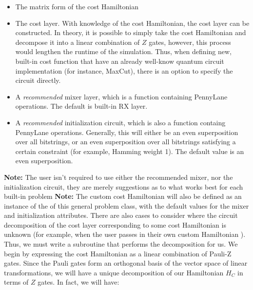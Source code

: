 \documentclass{article}
\begin{document}
   \begin{itemize}

	   \item The matrix form of the cost Hamiltonian
	   \item The cost layer. With knowledge of the cost Hamiltonian, the cost 
   		 layer can be constructed. In theory, it is possible to simply 
		 take the cost Hamiltonian and decompose it into a linear combination of 
		 $Z$ gates, however, this process would lengthen the runtime of the simulation. 
		 Thus, when defining new, built-in cost function that have an already well-know 
		 quantum circuit implementation (for instance, MaxCut), there is an option to specify the circuit
		 directly.
	   \item A \textit{recommended} mixer layer, which is a function containing
                 PennyLane operations. The default is built-in RX layer.
	   \item A \textit{recommended} initialization circuit, which is also a function 
                 containg PennyLane operations. Generally, this will either be an 
   		 even superposition over all bitstrings, or an even superposition over all 
   		 bitstrings satisfying a certain constraint (for example, Hamming weight 1).
   		 The default value is an even superposition.
   \end{itemize}

\noindent
\textbf{Note:} The user isn't required to use either the recommended mixer, nor the
initialization circuit, they are merely suggestions as to what works best 
for each built-in problem
\newline\newline
\noindent
\textbf{Note:} The custom cost Hamiltonian will also be defined as an instance of the of
this general problem class, with the default values for the mixer and initialization 
attributes. 
\newline\newline
\noindent
There are also cases to consider where the circuit decomposition of the cost layer corresponding to some cost 
Hamiltonian is unknown (for example, when the user passes in their own custom Hamiltonian
). Thus, we must write a subroutine that performs the decomposition for us. We begin by expressing the cost Hamiltonian 
as a linear combination of Pauli-Z gates. Since the Pauli gates form an orthogonal
basis of the vector space of linear transformations, we will have a unique decomposition
of our Hamiltonian $H_C$ in terms of $Z$ gates. In fact, we will have:
\end{document}
